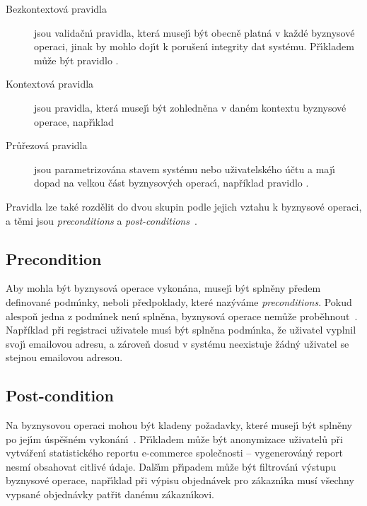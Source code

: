 \begin{description}
    \item [Bezkontextová pravidla] jsou validačn\'{\i} pravidla, která musej\'{\i} b\'yt obecně platná
    v každé byznysové operaci, jinak by mohlo doj\'{\i}t k porušen\'{\i} integrity dat systému.
    Př\'{\i}kladem může b\'yt pravidlo .
    \item [Kontextová pravidla] jsou pravidla, která musej\'{\i} b\'yt zohledněna v daném kontextu
    byznysové operace, např\'{\i}klad 
    \item [Průřezová pravidla] jsou parametrizována stavem systému nebo uživatelského účtu a maj\'{\i}
    dopad na velkou část byznysov\'ych operac\'{\i}, například pravidlo .
\end{description}

Pravidla lze také rozdělit do dvou skupin podle jejich vztahu k byznysové operaci, a těmi jsou
\textit{preconditions} a \textit{post-conditions}~\cite{morgan2002business, cemus2015automated}.

\subsection{Precondition}

Aby mohla b\'yt byznysová operace vykonána, musej\'{\i}
b\'yt splněny předem definované podm\'{\i}nky, neboli předpoklady,
které naz\'yváme \textit{preconditions}. Pokud alespoň jedna z podm\'{\i}nek
nen\'{\i} splněna, byznysová operace nemůže proběhnout~\cite{larman2001patterns}.
Například při registraci uživatele mus\'{\i} b\'yt splněna podm\'{\i}nka,
že uživatel vyplnil svoj\'{\i} emailovou adresu, a zároveň
dosud v systému neexistuje žádn\'y uživatel se stejnou emailovou adresou.

\subsection{Post-condition}

Na byznysovou operaci mohou b\'yt kladeny požadavky, které
musej\'{\i} b\'yt splněny po jej\'{\i}m úspěšném vykonán\'{\i}~\cite{cemus2015automated}.
Př\'{\i}kladem může b\'yt anonymizace uživatelů při vytvářen\'{\i} statistického
reportu e-commerce společnosti -- vygenerováný report
nesmí obsahovat citlivé údaje. Dalš\'{\i}m př\'{\i}padem může b\'yt filtrován\'{\i}
v\'ystupu byznysové operace, např\'{\i}klad při v\'ypisu objednávek pro zákazn\'{\i}ka
musí všechny vypsané objednávky patřit danému zákazn\'{\i}kovi.

